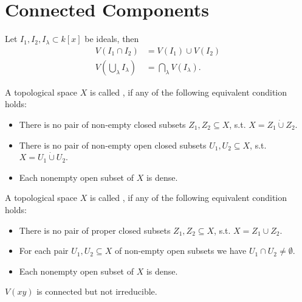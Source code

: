 \section{Connected Components}

\begin{lemma}
	Let $I_1, I_2, I_\lambda \subset k[x]$ be ideals, then
	\begin{align*}
	V(I_1 \cap I_2) &= V(I_1) \cup V(I_2)\\
	 V(\bigcup_\lambda I_\lambda) &= \bigcap_\lambda V(I_\lambda).
	\end{align*}
\end{lemma}

\begin{definition}
	A topological space $X$ is  called , if any of the following equivalent condition holds:
	\begin{itemize}
		\item There is no pair of non-empty closed subsets $Z_1,Z_2 \subseteq X$, s.t. $X = Z_1 \dot{\cup} Z_2$.
		\item There is no pair of non-empty open closed subsets $U_1,U_2 \subseteq X$, s.t. $X = U_1 \dot{\cup} U_2$.
		\item Each nonempty open subset of $X$ is dense.
	\end{itemize}
\end{definition}

\begin{definition}
	A topological space $X$ is  called , if any of the following equivalent condition holds:
	\begin{itemize}
		\item There is no pair of proper closed subsets $Z_1,Z_2 \subseteq X$, s.t. $X = Z_1 \cup Z_2$.
		\item For each pair $U_1,U_2 \subseteq X$ of non-empty open subsets we have $U_1\cap U_2 \neq \emptyset$.
		\item Each nonempty open subset of $X$ is dense.
	\end{itemize}
\end{definition}

\begin{example}
	$V(xy)$ is connected but not irreducible.
\end{example}
